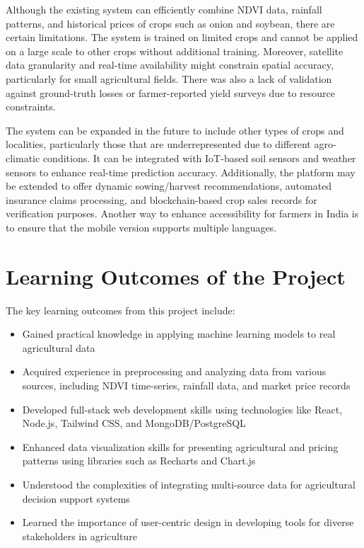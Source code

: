 Although the existing system can efficiently combine NDVI data, rainfall patterns, and historical prices of crops such as onion and soybean, there are certain limitations. The system is trained on limited crops and cannot be applied on a large scale to other crops without additional training. Moreover, satellite data granularity and real-time availability might constrain spatial accuracy, particularly for small agricultural fields. There was also a lack of validation against ground-truth losses or farmer-reported yield surveys due to resource constraints.

The system can be expanded in the future to include other types of crops and localities, particularly those that are underrepresented due to different agro-climatic conditions. It can be integrated with IoT-based soil sensors and weather sensors to enhance real-time prediction accuracy. Additionally, the platform may be extended to offer dynamic sowing/harvest recommendations, automated insurance claims processing, and blockchain-based crop sales records for verification purposes. Another way to enhance accessibility for farmers in India is to ensure that the mobile version supports multiple languages.

\section{Learning Outcomes of the Project}

The key learning outcomes from this project include:

\begin{itemize}
	\item Gained practical knowledge in applying machine learning models to real agricultural data
	\item Acquired experience in preprocessing and analyzing data from various sources, including NDVI time-series, rainfall data, and market price records
	\item Developed full-stack web development skills using technologies like React, Node.js, Tailwind CSS, and MongoDB/PostgreSQL
	\item Enhanced data visualization skills for presenting agricultural and pricing patterns using libraries such as Recharts and Chart.js
	\item Understood the complexities of integrating multi-source data for agricultural decision support systems
	\item Learned the importance of user-centric design in developing tools for diverse stakeholders in agriculture
\end{itemize}